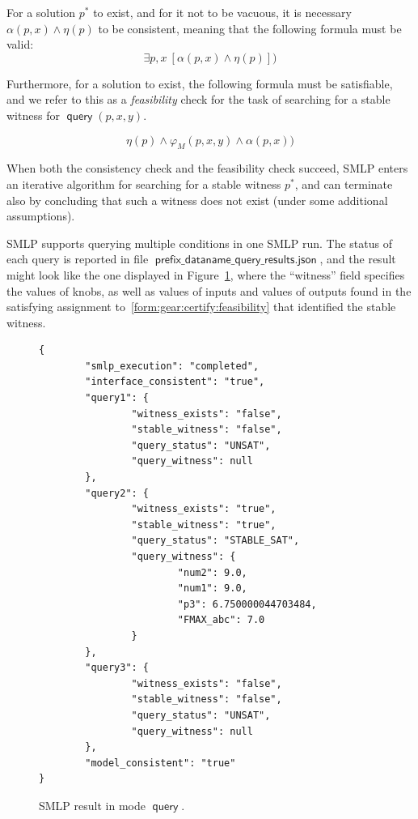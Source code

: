 \documentclass[a4paper,parskip=half]{article} %
\newcommand*\query{\operatorname{\mathsf{query}}}
\newcommand*\suffix[1]{\operatorname{\mathsf{#1}}} %
\newcommand*\mode[1]{\operatorname{\mathsf{#1}}} %
\begin{document}
For a solution $p^*$ to exist, and for it not to be vacuous, it is necessary $\alpha(p, x) \wedge \eta(p)$ to be consistent, 
meaning that the following formula must be valid:
\begin{equation}\label{form:gear:query:consistency}
\exists p,x~ [\alpha(p, x) \wedge \eta(p)])
\end{equation}

Furthermore, for a solution to exist, the following formula must be satisfiable, and we refer to this as a \emph{feasibility} 
check for the task of searching for a stable witness for $\query(p,x,y)$. 

\begin{equation}\label{form:gear:query:feasibility}
       \eta(p) \wedge \varphi_M(p,x,y)  \wedge  \alpha(p,x))
\end{equation}

When both the consistency check and the feasibility check succeed, SMLP enters an iterative algorithm for
searching for a stable witness $p^*$, and can terminate also by concluding that such a witness does not exist 
(under some additional assumptions).


SMLP supports querying multiple conditions in one SMLP run. 
The status of each query is reported in file $\suffix{prefix\_dataname\_query\_results.json}$, 
and the result might look like the one displayed in Figure~\cref{fig:query:result}, where the ``witness'' field 
specifies the values of knobs, as well as values of inputs and values of outputs
found in the satisfying assignment to~\cref{form:gear:certify:feasibility} that identified the stable witness.

\begin{figure}
\small
\begin{verbatim}
{
        "smlp_execution": "completed",
        "interface_consistent": "true",
        "query1": {
                "witness_exists": "false",
                "stable_witness": "false",
                "query_status": "UNSAT",
                "query_witness": null
        },
        "query2": {
                "witness_exists": "true",
                "stable_witness": "true",
                "query_status": "STABLE_SAT",
                "query_witness": {
                        "num2": 9.0,
                        "num1": 9.0,
                        "p3": 6.750000044703484,
                        "FMAX_abc": 7.0
                }
        },
        "query3": {
                "witness_exists": "false",
                "stable_witness": "false",
                "query_status": "UNSAT",
                "query_witness": null
        },
        "model_consistent": "true"
}
\end{verbatim}
\caption{SMLP result in mode $\mode{query}$.}\label{fig:query:result}
\end{figure}
\end{document}
